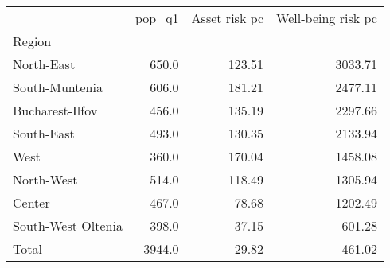 \begin{tabular}{lrrr}
\toprule
{} &  pop\_q1 &  Asset risk pc &  Well-being risk pc \\
Region             &         &                &                     \\
\midrule
North-East         &   650.0 &         123.51 &             3033.71 \\
South-Muntenia     &   606.0 &         181.21 &             2477.11 \\
Bucharest-Ilfov    &   456.0 &         135.19 &             2297.66 \\
South-East         &   493.0 &         130.35 &             2133.94 \\
West               &   360.0 &         170.04 &             1458.08 \\
North-West         &   514.0 &         118.49 &             1305.94 \\
Center             &   467.0 &          78.68 &             1202.49 \\
South-West Oltenia &   398.0 &          37.15 &              601.28 \\
Total              &  3944.0 &          29.82 &              461.02 \\
\bottomrule
\end{tabular}
